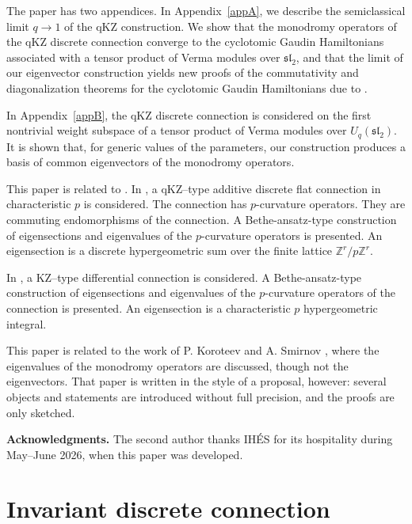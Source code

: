 \documentclass[12pt]{amsart}
\let\frak\mathfrak
\theoremstyle{definition} %
\numberwithin{equation}{section}
\theoremstyle{definition}
\def\Z{{\mathbb Z}}
\begin{document}
\smallskip

The paper has two appendices. 
In Appendix~\ref{appA}, we describe the semiclassical limit $q\to 1$ of the qKZ construction. We show that the monodromy operators of the qKZ discrete connection converge to the cyclotomic Gaudin Hamiltonians associated with a tensor product of Verma modules over $\frak{sl}_2$, and that the limit of our eigenvector construction yields new proofs of the commutativity and diagonalization theorems for the cyclotomic Gaudin Hamiltonians due to \cite{VY}.

In Appendix~\ref{appB}, the qKZ discrete connection is considered on the first nontrivial weight subspace of a tensor product of Verma modules over $U_q(\frak{sl}_2)$. It is shown that, for generic values of the parameters, our construction produces a basis of common eigenvectors of the monodromy operators.


\smallskip

This paper is related to \cite{TV3, TV4}.
In \cite{TV3},
a qKZ--type additive discrete flat connection in characteristic $p$ is considered.
The connection has $p$-curvature operators. They
are commuting endomorphisms of the connection. A Bethe-ansatz-type
construction of eigensections and eigenvalues of the $p$-curvature operators is presented.
An eigensection is a discrete
hypergeometric sum over the finite lattice
$\Z^r/p\Z^r$.

In \cite{TV4},
a KZ--type differential connection is considered.
A Bethe-ansatz-type
construction of eigensections and eigenvalues of the $p$-curvature operators of the connection
is presented.
An eigensection is a characteristic $p$ hypergeometric integral.

\smallskip

This paper is related to the work of P. Koroteev and A.
Smirnov \cite{KS}, where the eigenvalues of the monodromy operators are discussed, though
not the eigenvectors.
That paper is written in the style of a proposal, however: several
objects and statements are introduced without full precision, and the proofs are only sketched.

\smallskip

\noindent\textbf{Acknowledgments.}
The second author thanks IH\'ES for its hospitality during May--June 2026, when this paper was developed.

\section{Invariant discrete connection}
\label{sec 2}
\end{document}
